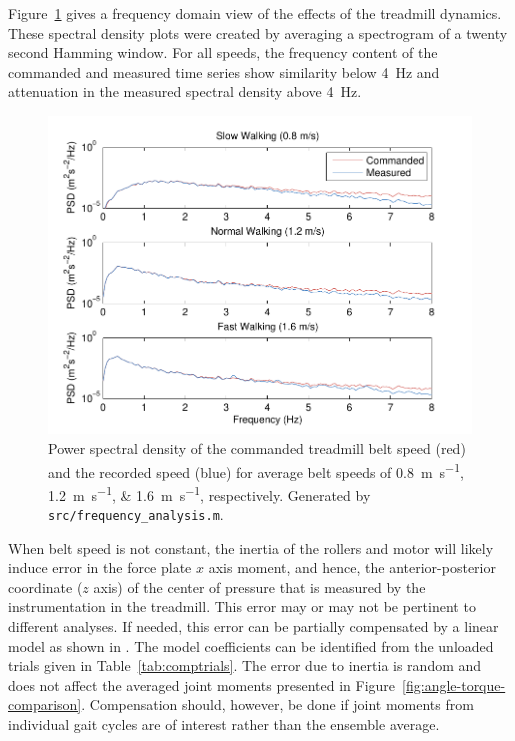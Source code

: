 \documentclass[fleqn,12pt]{wlpeerj}
\begin{document}
Figure~\ref{fig:freq_analysis} gives a frequency domain view of the effects of
the treadmill dynamics. These spectral density plots were created by averaging
a spectrogram of a twenty second Hamming window. For all speeds, the frequency
content of the commanded and measured time series show similarity below
4~\si{\hertz} and attenuation in the measured spectral density above
4~\si{\hertz}.
%
\begin{figure}
  \centering
  \includegraphics{figures/frequency_analysis.pdf}
  \cprotect\caption{Power spectral density of the commanded treadmill belt
    speed (red) and the recorded speed (blue) for average belt speeds of
    \SIlist{0.8;1.2;1.6}{\meter\per\second}, respectively. Generated by
    \verb|src/frequency_analysis.m|.}
  \label{fig:freq_analysis}
\end{figure}

When belt speed is not constant, the inertia of the rollers and motor will
likely induce error in the force plate $x$ axis moment, and hence, the
anterior-posterior coordinate ($z$ axis) of the center of pressure that is
measured by the instrumentation in the treadmill. This error may or may not be
pertinent to different analyses. If needed, this error can be partially
compensated by a linear model as shown in \cite{Hnat2014}. The model
coefficients can be identified from the unloaded trials given in
Table~\ref{tab:comptrials}. The error due to inertia is random and does not
affect the averaged joint moments presented in
Figure~\ref{fig:angle-torque-comparison}. Compensation should, however, be done
if joint moments from individual gait cycles are of interest rather than the
ensemble average.
%
\begin{table}
  \cprotect\caption{A list of unloaded trials collected for each speed. Each
    loaded trial includes a compensation file listed in its meta data which
    matches it to these unloaded trials. Generated by
    \verb|src/subject_table.py|.}
  \centering
  \small
  
  \label{tab:comptrials}
\end{table}
\end{document}
